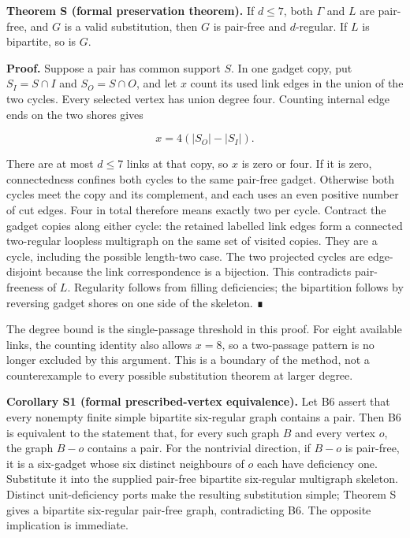 \documentclass[
  11pt,
]{article}
\newcounter{none} %
\begin{document}
\textbf{Theorem S (formal preservation theorem).} If \(d\leq7\), both
\(\Gamma\) and \(L\) are pair-free, and \(G\) is a valid substitution,
then \(G\) is pair-free and \(d\)-regular. If \(L\) is bipartite, so is
\(G\).

\textbf{Proof.} Suppose a pair has common support \(S\). In one gadget
copy, put \(S_I=S\cap I\) and \(S_O=S\cap O\), and let \(x\) count its
used link edges in the union of the two cycles. Every selected vertex
has union degree four. Counting internal edge ends on the two shores
gives

\[
x=4(|S_O|-|S_I|).
\]

There are at most \(d\leq7\) links at that copy, so \(x\) is zero or
four. If it is zero, connectedness confines both cycles to the same
pair-free gadget. Otherwise both cycles meet the copy and its
complement, and each uses an even positive number of cut edges. Four in
total therefore means exactly two per cycle. Contract the gadget copies
along either cycle: the retained labelled link edges form a connected
two-regular loopless multigraph on the same set of visited copies. They
are a cycle, including the possible length-two case. The two projected
cycles are edge-disjoint because the link correspondence is a bijection.
This contradicts pair-freeness of \(L\). Regularity follows from filling
deficiencies; the bipartition follows by reversing gadget shores on one
side of the skeleton. ∎

The degree bound is the single-passage threshold in this proof. For
eight available links, the counting identity also allows \(x=8\), so a
two-passage pattern is no longer excluded by this argument. This is a
boundary of the method, not a counterexample to every possible
substitution theorem at larger degree.

\textbf{Corollary S1 (formal prescribed-vertex equivalence).} Let B6
assert that every nonempty finite simple bipartite six-regular graph
contains a pair. Then B6 is equivalent to the statement that, for every
such graph \(B\) and every vertex \(o\), the graph \(B-o\) contains a
pair. For the nontrivial direction, if \(B-o\) is pair-free, it is a
six-gadget whose six distinct neighbours of \(o\) each have deficiency
one. Substitute it into the supplied pair-free bipartite six-regular
multigraph skeleton. Distinct unit-deficiency ports make the resulting
substitution simple; Theorem S gives a bipartite six-regular pair-free
graph, contradicting B6. The opposite implication is immediate.
\end{document}
